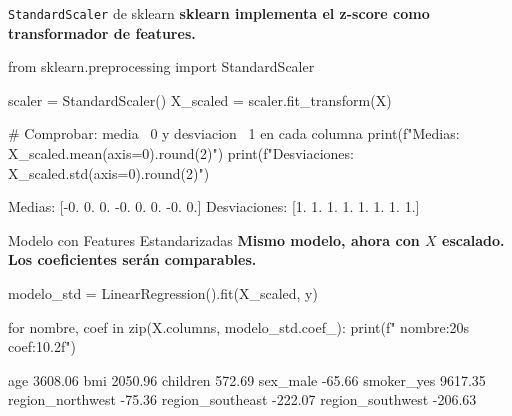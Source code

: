 \documentclass[aspectratio=169, 11pt]{beamer}
\begin{document}
\begin{frame}[fragile,shrink=28]{\texttt{StandardScaler} de sklearn}
  \vspace{-6pt}
  {\footnotesize\color{arcaDark}\bfseries
    sklearn implementa el z-score como transformador de features.}

  \vspace{4pt}
  \begin{pyblock}
from sklearn.preprocessing import StandardScaler

scaler = StandardScaler()
X_scaled = scaler.fit_transform(X)

# Comprobar: media ~0 y desviacion ~1 en cada columna
print(f"Medias:       {X_scaled.mean(axis=0).round(2)}")
print(f"Desviaciones: {X_scaled.std(axis=0).round(2)}")
  \end{pyblock}

  \vspace{4pt}
  \begin{outputblock}
Medias:       [-0.  0.  0. -0.  0.  0. -0.  0.]
Desviaciones: [1. 1. 1. 1. 1. 1. 1. 1.]
  \end{outputblock}
\end{frame}

\begin{frame}[fragile,shrink=28]{Modelo con Features Estandarizadas}
  \vspace{-6pt}
  {\footnotesize\color{arcaDark}\bfseries
    Mismo modelo, ahora con $X$ escalado. Los coeficientes serán comparables.}

  \vspace{4pt}
  \begin{pyblock}
modelo_std = LinearRegression().fit(X_scaled, y)

for nombre, coef in zip(X.columns, modelo_std.coef_):
    print(f"  {nombre:20s} {coef:10.2f}")
  \end{pyblock}

  \vspace{4pt}
  \begin{outputblock}
  age                    3608.06
  bmi                    2050.96
  children                572.69
  sex_male                -65.66
  smoker_yes             9617.35
  region_northwest        -75.36
  region_southeast        -222.07
  region_southwest        -206.63
  \end{outputblock}
\end{frame}
\end{document}
